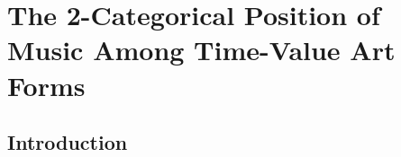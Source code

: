 \chapter{The 2-Categorical Position of Music Among Time-Value Art Forms}

\begingroup


\def\Cat{\mathbf{Cat}}

\def\Set{\mathbf{Set}}

\def\B{\mathbf{B}}

\def\V{\mathcal{V}}

\def\I{\mathcal{I}}

\def\J{\mathcal{J}}

\def\Rhy{\mathbf{Rhy}}

\def\Mel{\mathbf{Mel}}

\def\Harm{\mathbf{Harm}}

\def\Pitch{\mathbf{Pitch}}

\def\Disc{\mathbf{Disc}}

\def\Frame{\mathfrak{A}}

\def\op{^{\mathrm{op}}}

\def\R{\mathbb{R}}

\def\Z{\mathbb{Z}}

\def\N{\mathbb{N}}

\def\Xmus{X_{\mathrm{mus}}}

\begin{abstract}
\noindent This chapter models rhythm, melody, and harmony through a
parameter pair $(\B, \V)$: a base category of temporal or event
structure and a value category of possible labels, pitches, timbres,
or expressive states. Letting this pair vary organises time-value art
forms into a 2-category $\Frame$. The chromatic lattice, viewed as a
finite directed graph, distinguishes a reference object
$\Xmus \in \Frame$. The question \emph{``is $X$ music?''} is
recast as a structural question about the hom-category
$\Frame(X, \Xmus)$: it may admit faithful musicalisations, fully
faithful ones, or none. We classify several borderline cases — paired
poetry, dialogue, Gregorian chant, classical Chinese verse,
\emph{Sprechstimme}, birdsong, ritual percussion, a calling flock —
and read off, in each case, what the verdict depends on.
\end{abstract}

\section{Introduction}

